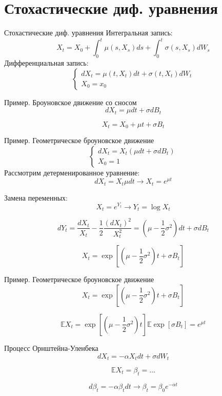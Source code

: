 \documentclass{beamer}
\begin{document}
\section{Стохастические диф. уравнения}
\begin{frame}{Стохастические диф. уравнения}
    Интегральная запись:
    $$
        X_t = X_0 + \int_0^t \mu(s, X_s) ds + \int_0^t \sigma(s, X_s) dW_s
    $$
    Дифференциальная запись:
    $$
        \begin{cases}
            d X_t = \mu(t, X_t) dt + \sigma(t, X_t) dW_t \\
            X_0 = x_0
        \end{cases}
    $$
\end{frame}

\begin{frame}{Пример. Броуновское движение со сносом}
    $$
        dX_t = \mu dt + \sigma dB_t 
    $$
     
    $$
        X_t = X_0 + \mu t + \sigma B_t
    $$
\end{frame}

\begin{frame}{Пример. Геометрическое броуновское движение}
    $$\begin{cases}
            dX_t = X_t \left( \mu dt + \sigma dB_t \right) \\
            X_0 = 1
    \end{cases}$$
      Рассмотрим детерменированное уравнение:
    $$
        dX_t = X_t \mu dt \to X_t = e^{\mu t}
    $$
     
    Замена переменных:
    $$X_t = e^{Y_t} \longrightarrow  Y_t = \log X_t$$
      
    $$d Y_t = \dfrac{d X_t}{X_t} - \dfrac{1}{2} \dfrac{(dX_t)^2}{X_t^2} =\left( \mu - \dfrac{1}{2}\sigma^2 \right) dt + \sigma dB_t$$
     
    $$X_t = \exp\left[ \left( \mu - \dfrac{1}{2}\sigma^2 \right) t + \sigma B_t \right]$$
\end{frame}

\begin{frame}{Пример. Геометрическое броуновское движение}
    $$X_t = \exp\left[ \left( \mu - \dfrac{1}{2}\sigma^2 \right) t + \sigma B_t \right]$$
    
    $$
        \mathbb{E} X_t =   \exp \left[ \left( \mu - \dfrac{1}{2}\sigma^2 \right) t \right] \mathbb{E} \exp \left[
            \sigma B_t
        \right] =   e^{\mu t}
    $$
\end{frame}

\begin{frame}{Процесс Орнштейна-Уленбека}
    $$
        d X_t = -\alpha X_t dt + \sigma dW_t
    $$
      
    $$
        \mathbb{E} X_t = \beta_t = \ldots
    $$
      
    $$
        d \beta_t = -\alpha \beta_t dt \longrightarrow    \beta_t = \beta_0 e^{-\alpha t}  
    $$
\end{frame}
\end{document}
